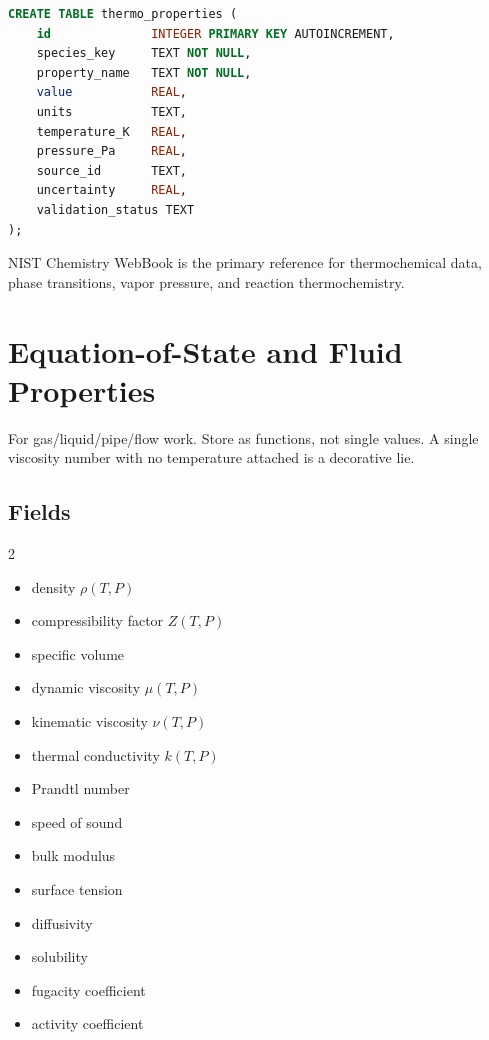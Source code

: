 \documentclass[11pt, a4paper]{article}
\begin{document}
\begin{lstlisting}[language=SQL]
CREATE TABLE thermo_properties (
    id              INTEGER PRIMARY KEY AUTOINCREMENT,
    species_key     TEXT NOT NULL,
    property_name   TEXT NOT NULL,
    value           REAL,
    units           TEXT,
    temperature_K   REAL,
    pressure_Pa     REAL,
    source_id       TEXT,
    uncertainty     REAL,
    validation_status TEXT
);
\end{lstlisting}

NIST Chemistry WebBook is the primary reference for thermochemical data, phase transitions, vapor pressure, and reaction thermochemistry.

\section{Equation-of-State and Fluid Properties}

For gas/liquid/pipe/flow work. Store as functions, not single values. A single viscosity number with no temperature attached is a decorative lie.

\subsection{Fields}

\begin{multicols}{2}
\begin{itemize}[itemsep=1pt, leftmargin=*]
  \item density $\rho(T,P)$
  \item compressibility factor $Z(T,P)$
  \item specific volume
  \item dynamic viscosity $\mu(T,P)$
  \item kinematic viscosity $\nu(T,P)$
  \item thermal conductivity $k(T,P)$
  \item Prandtl number
  \item speed of sound
  \item bulk modulus
  \item surface tension
  \item diffusivity
  \item solubility
  \item fugacity coefficient
  \item activity coefficient
\end{itemize}
\end{multicols}
\end{document}
